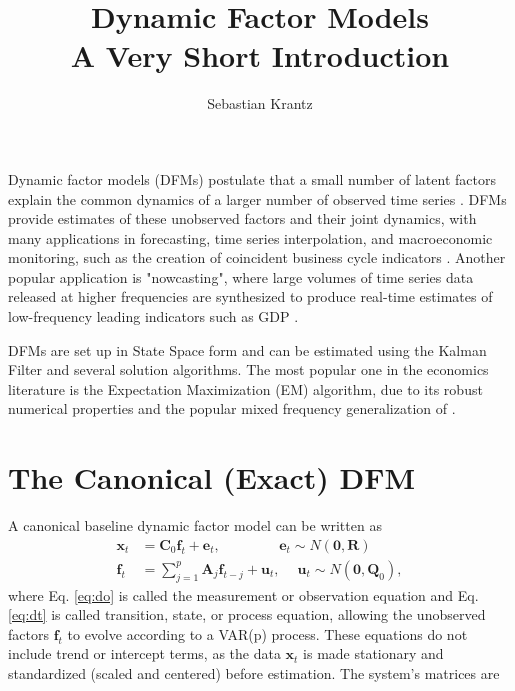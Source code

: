 \documentclass[a4paper]{article}
\title{\textbf{Dynamic Factor Models}\\ A Very Short Introduction}
\author{Sebastian Krantz}
\begin{document}
\maketitle

Dynamic factor models (DFMs) postulate that a small number of latent factors explain the common dynamics of a larger number of observed time series \citep{stock2016dynamic}. DFMs provide estimates of these unobserved factors and their joint dynamics, with many applications in forecasting, time series interpolation, and macroeconomic monitoring, such as the creation of coincident business cycle indicators \citep{mariano2003new}. Another popular application is "nowcasting", where large volumes of time series data released at higher frequencies are synthesized to produce real-time estimates of low-frequency leading indicators such as GDP \citep{bok2018macroeconomic}. \newline

DFMs are set up in State Space form and can be estimated using the Kalman Filter and several solution algorithms. The most popular one in the economics literature is the Expectation Maximization (EM) algorithm, due to its robust numerical properties \citep{doz2012quasi} and the popular mixed frequency generalization of \citet{banbura2014maximum}. %

\section{The Canonical (Exact) DFM}

A canonical baseline dynamic factor model can be written as
\begin{align} \label{eq:do}
\textbf{x}_t &= \textbf{C}_0 \textbf{f}_t + \textbf{e}_t, \qquad\qquad\, \textbf{e}_t\sim N(\textbf{0}, \textbf{R}) \\ \label{eq:dt}
\textbf{f}_t &= \sum_{j=1}^p \textbf{A}_j \textbf{f}_{t-j} + \textbf{u}_t, \quad\ \textbf{u}_t\sim  N(\textbf{0}, \textbf{Q}_0),
\end{align}
\noindent where Eq. \ref{eq:do} is called the measurement or observation equation and Eq. \ref{eq:dt} is called transition, state, or process equation, allowing the unobserved factors $\textbf{f}_t$ to evolve according to a VAR(p) process. These equations do not include trend or intercept terms, as the data $\textbf{x}_t$ is made stationary and standardized (scaled and centered) before estimation. The system's matrices are \newline
\end{document}
